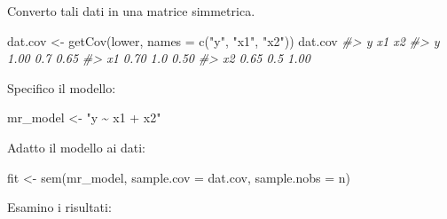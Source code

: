 \documentclass[
  11pt,
]{krantz}
\makeatletter
\newenvironment{Shaded}{\begin{snugshade}}{\end{snugshade}}
\newcommand{\AttributeTok}[1]{\textcolor[rgb]{0.61,0.61,0.61}{#1}}
\newcommand{\CommentTok}[1]{\textcolor[rgb]{0.37,0.37,0.37}{\textit{#1}}}
\newcommand{\FunctionTok}[1]{\textcolor[rgb]{0,0,0}{#1}}
\newcommand{\NormalTok}[1]{#1}
\newcommand{\OtherTok}[1]{\textcolor[rgb]{0.37,0.37,0.37}{#1}}
\newcommand{\StringTok}[1]{\textcolor[rgb]{0.5,0.5,0.5}{#1}}
\newenvironment{kframe}{%
\medskip{}
\setlength{\fboxsep}{.8em}
 \def\at@end@of@kframe{}%
 \ifinner\ifhmode%
  \def\at@end@of@kframe{\end{minipage}}%
  \begin{minipage}{\columnwidth}%
 \fi\fi%
 \def\FrameCommand##1{\hskip\@totalleftmargin \hskip-\fboxsep
 \colorbox{shadecolor}{##1}\hskip-\fboxsep
     \hskip-\linewidth \hskip-\@totalleftmargin \hskip\columnwidth}%
 \MakeFramed {\advance\hsize-\width
   \@totalleftmargin\z@ \linewidth\hsize
   \@setminipage}}%
 {\par\unskip\endMakeFramed%
 \at@end@of@kframe}
\renewenvironment{Shaded}{\begin{kframe}}{\end{kframe}}
\theoremstyle{definition}
\theoremstyle{definition}
\theoremstyle{definition}
\theoremstyle{definition}
\theoremstyle{remark}
\makeatother
\begin{document}
Converto tali dati in una matrice simmetrica.

\begin{Shaded}
\begin{Highlighting}[]
\NormalTok{dat.cov }\OtherTok{\textless{}{-}} \FunctionTok{getCov}\NormalTok{(lower, }\AttributeTok{names =} \FunctionTok{c}\NormalTok{(}\StringTok{"y"}\NormalTok{, }\StringTok{"x1"}\NormalTok{, }\StringTok{"x2"}\NormalTok{))}
\NormalTok{dat.cov}
\CommentTok{\#\textgreater{}       y  x1   x2}
\CommentTok{\#\textgreater{} y  1.00 0.7 0.65}
\CommentTok{\#\textgreater{} x1 0.70 1.0 0.50}
\CommentTok{\#\textgreater{} x2 0.65 0.5 1.00}
\end{Highlighting}
\end{Shaded}

Specifico il modello:

\begin{Shaded}
\begin{Highlighting}[]
\NormalTok{mr\_model }\OtherTok{\textless{}{-}} \StringTok{"y \textasciitilde{} x1 + x2"}
\end{Highlighting}
\end{Shaded}

Adatto il modello ai dati:

\begin{Shaded}
\begin{Highlighting}[]
\NormalTok{fit }\OtherTok{\textless{}{-}} \FunctionTok{sem}\NormalTok{(mr\_model, }\AttributeTok{sample.cov =}\NormalTok{ dat.cov, }\AttributeTok{sample.nobs =}\NormalTok{ n)}
\end{Highlighting}
\end{Shaded}

Esamino i risultati:
\end{document}
